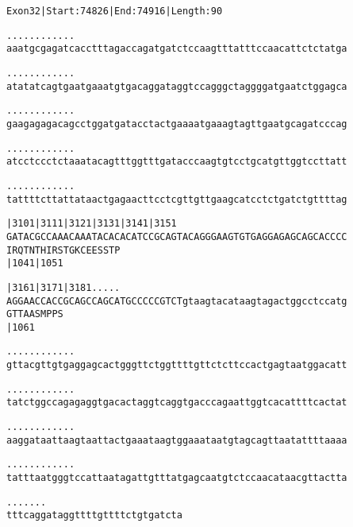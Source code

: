 \documentclass{article}
\begin{document}
\newpage
\begin{alltt}
Exon 32 | Start: 74826 | End: 74916 | Length: 90

.    .    .    .    .    .    .    .    .    .    .    .
aaatgcgagatcacctttagaccagatgatctccaagtttatttccaacattctctatga



.    .    .    .    .    .    .    .    .    .    .    .
atatatcagtgaatgaaatgtgacaggataggtccagggctaggggatgaatctggagca



.    .    .    .    .    .    .    .    .    .    .    .
gaagagagacagcctggatgatacctactgaaaatgaaagtagttgaatgcagatcccag



.    .    .    .    .    .    .    .    .    .    .    .
atcctccctctaaatacagtttggtttgatacccaagtgtcctgcatgttggtccttatt



.    .    .    .    .    .    .    .    .    .    .    .
tattttcttattataactgagaacttcctcgttgttgaagcatcctctgatctgttttag



     |3101     |3111     |3121     |3131     |3141     |3151
GATACGCCAAACAAATACACACATCCGCAGTACAGGGAAGTGTGAGGAGAGCAGCACCCC
 I  R  Q  T  N  T  H  I  R  S  T  G  K  C  E  E  S  S  T  P
                         |1041                         |1051

     |3161     |3171     |3181     .    .    .    .    .
AGGAACCACCGCAGCCAGCATGCCCCCGTCTgtaagtacataagtagactggcctccatg
 G  T  T  A  A  S  M  P  P  S
                         |1061

.    .    .    .    .    .    .    .    .    .    .    .
gttacgttgtgaggagcactgggttctggttttgttctcttccactgagtaatggacatt



\end{alltt}
\newpage
\begin{alltt}
.    .    .    .    .    .    .    .    .    .    .    .
tatctggccagagaggtgacactaggtcaggtgacccagaattggtcacattttcactat



.    .    .    .    .    .    .    .    .    .    .    .
aaggataattaagtaattactgaaataagtggaaataatgtagcagttaatattttaaaa



.    .    .    .    .    .    .    .    .    .    .    .
tatttaatgggtccattaatagattgtttatgagcaatgtctccaacataacgttactta



.    .    .    .    .    .    .
tttcaggataggttttgttttctgtgatcta


\end{alltt}
\end{document}

